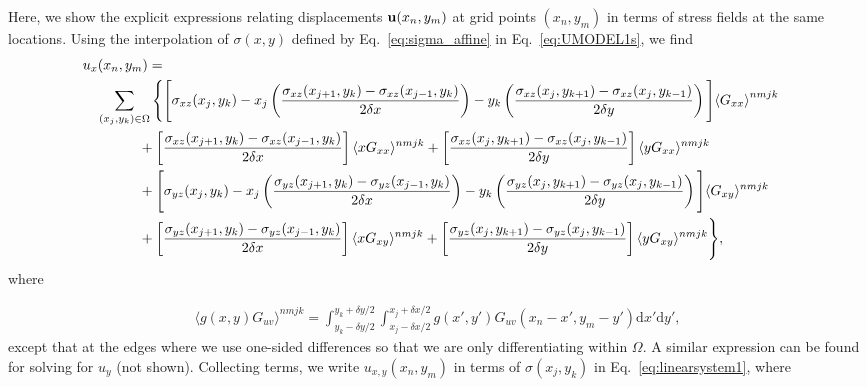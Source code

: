 \documentclass[aps,prl,reprint,twocolumn,groupedaddress,showpacs]{revtex4}
\def\dd{\mbox{d}}
\def\u{{\bf u}}
\begin{document}
\begin{widetext}
Here, we show the explicit expressions relating displacements $\u(x_{n}, y_{m})$ at 
grid points $(x_{n},y_{m})$ in terms of stress fields at the same locations. Using 
the interpolation of $\sigma(x,y)$ defined by Eq.~\ref{eq:sigma_affine} in 
Eq.~\ref{eq:UMODEL1s}, we find
%
\begin{align}
\lefteqn{u_x(x_n,y_m) =}  \nonumber\\
 & \quad \sum_{(x_j,y_k)\in\Omega} \Bigg\{ \Bigg[\sigma_{xz}(x_j,y_k)
- x_j\left(\frac{\sigma_{xz}(x_{j+1},y_k) - \sigma_{xz}(x_{j-1},y_k)}{2\delta x}\right)
 -y_k\left( \frac{\sigma_{xz}(x_j,y_{k+1}) -
\sigma_{xz}(x_j,y_{k-1})}{2\delta y}\right) \Bigg]{\langle G_{xx} \rangle}^{nmjk} \nonumber \\
& \qquad\qquad +\left[ \frac{\sigma_{xz}(x_{j+1},y_k) -
\sigma_{xz}(x_{j-1},y_k)}{2\delta x}\right]\langle xG_{xx} \rangle^{nmjk} + \left[  \frac{\sigma_{xz}(x_j,y_{k+1}) - \sigma_{xz}(x_j,y_{k-1}) }{2\delta y} \right]
\langle yG_{xx} \rangle^{nmjk}\nonumber\\
&\qquad\qquad + \Bigg[\sigma_{yz}(x_j,y_k)-x_j\left(\frac{\sigma_{yz}(x_{j+1},y_k)-
\sigma_{yz}(x_{j-1},y_k) }{2\delta x}\right)-y_k\left( \frac{\sigma_{yz}(x_j,y_{k+1}) 
-\sigma_{yz}(x_j,y_{k-1}) }{2\delta y}\right) \Bigg] \langle G_{xy} \rangle^{nmjk}\nonumber \\
&\qquad\qquad +\left[ \frac{\sigma_{yz}(x_{j+1},y_k) - 
\sigma_{yz}(x_{j-1},y_k) }{2\delta x}\right]  
\langle xG_{xy} \rangle^{nmjk} + 
\left[\frac{\sigma_{yz}(x_j,y_{k+1}) - 
\sigma_{yz}(x_j,y_{k-1}) }{2\delta y}\right]\langle yG_{xy} \rangle^{nmjk} \Bigg\},
\label{eq:ux_decomposed}
\end{align}
%
where

\begin{align}
\langle g(x,y)G_{uv} \rangle^{nmjk} = \int_{y_k-\delta y/2}^{y_k+\delta y/2} 
\int_{x_j-\delta x/2}^{x_j+\delta x/2} g(x',y')
G_{uv}(x_n-x',y_m-y')\dd x'\dd y', \label{eq:G_ave} 
\end{align}
%
except that at the edges where we use one-sided differences so that we
are only differentiating within $\Omega$. A similar expression can be
found for solving for $u_y$ (not shown). Collecting terms, we 
write $u_{x,y}(x_{n},y_{m})$ in terms of $\sigma(x_{j}, y_{k})$ 
in Eq.~\ref{eq:linearsystem1}, where 


\end{widetext}
\end{document}
